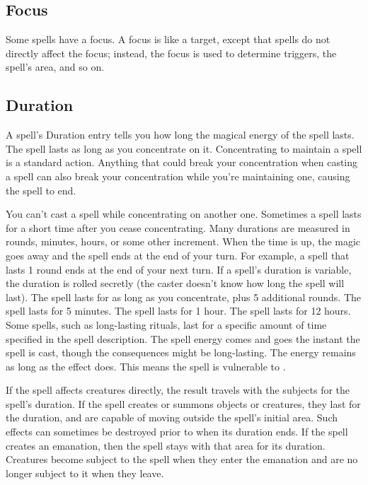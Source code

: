 \subsection{Focus}
Some spells have a focus. A focus is like a target, except that spells do not directly affect the focus; instead, the focus is used to determine triggers, the spell's area, and so on.

\subsection{Duration}
A spell's Duration entry tells you how long the magical energy of the spell lasts.
 The spell lasts as long as you concentrate on it. Concentrating to maintain a spell is a standard action. Anything that could break your concentration when casting a spell can also break your concentration while you're maintaining one, causing the spell to end.

You can't cast a spell while concentrating on another one. Sometimes a spell lasts for a short time after you cease concentrating.
 Many durations are measured in rounds, minutes, hours, or some other increment. When the time is up, the magic goes away and the spell ends at the end of your turn. For example, a spell that lasts 1 round ends at the end of your next turn. If a spell's duration is variable, the duration is rolled secretly (the caster doesn't know how long the spell will last).
 The spell lasts for as long as you concentrate, plus 5 additional rounds.
 The spell lasts for 5 minutes.
 The spell lasts for 1 hour.
 The spell lasts for 12 hours.
 Some spells, such as long-lasting rituals, last for a specific amount of time specified in the spell description.
 The spell energy comes and goes the instant the spell is cast, though the consequences might be long-lasting.
 The energy remains as long as the effect does. This means the spell is vulnerable to .

 If the spell affects creatures directly, the result travels with the subjects for the spell's duration. If the spell creates or summons objects or creatures, they last for the duration, and are capable of moving outside the spell's initial area. Such effects can sometimes be destroyed prior to when its duration ends. If the spell creates an emanation, then the spell stays with that area for its duration. Creatures become subject to the spell when they enter the emanation and are no longer subject to it when they leave.

